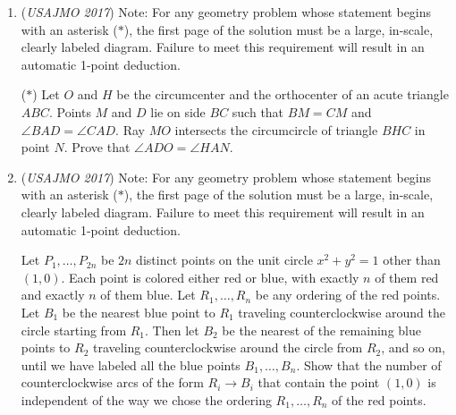 \begin{enumerate}
 Are there any triples $(a,b,c)$ of positive integers such that $(a-2)(b-2)(c-2) + 12$ is a prime that properly divides the positive number $a^2 + b^2 + c^2 + abc - 2017$?


 

	\item (\textit{USAJMO 2017}) Note: For any geometry problem whose statement begins with an asterisk ($*$), the first page of the solution must be a large, in-scale, clearly labeled diagram. Failure to meet this requirement will result in an automatic 1-point deduction. 


 ($*$) Let $O$ and $H$ be the circumcenter and the orthocenter of an acute triangle $ABC$. Points $M$ and $D$ lie on side $BC$ such that $BM = CM$ and $\angle BAD = \angle CAD$. Ray $MO$ intersects the circumcircle of triangle $BHC$ in point $N$. Prove that $\angle ADO = \angle HAN$. 


 

	\item (\textit{USAJMO 2017}) Note: For any geometry problem whose statement begins with an asterisk ($*$), the first page of the solution must be a large, in-scale, clearly labeled diagram. Failure to meet this requirement will result in an automatic 1-point deduction. 


 Let $P_1, \ldots, P_{2n}$ be $2n$ distinct points on the unit circle $x^2 + y^2 = 1$ other than $(1,0)$. Each point is colored either red or blue, with exactly $n$ of them red and exactly $n$ of them blue. Let $R_1, \ldots, R_n$ be any ordering of the red points. Let $B_1$ be the nearest blue point to $R_1$ traveling counterclockwise around the circle starting from $R_1$. Then let $B_2$ be the nearest of the remaining blue points to $R_2$ traveling counterclockwise around the circle from $R_2$, and so on, until we have labeled all the blue points $B_1, \ldots, B_n$. Show that the number of counterclockwise arcs of the form $R_i \rightarrow B_i$ that contain the point $(1,0)$ is independent of the way we chose the ordering $R_1, \ldots, R_n$ of the red points. 


 

\end{enumerate}
